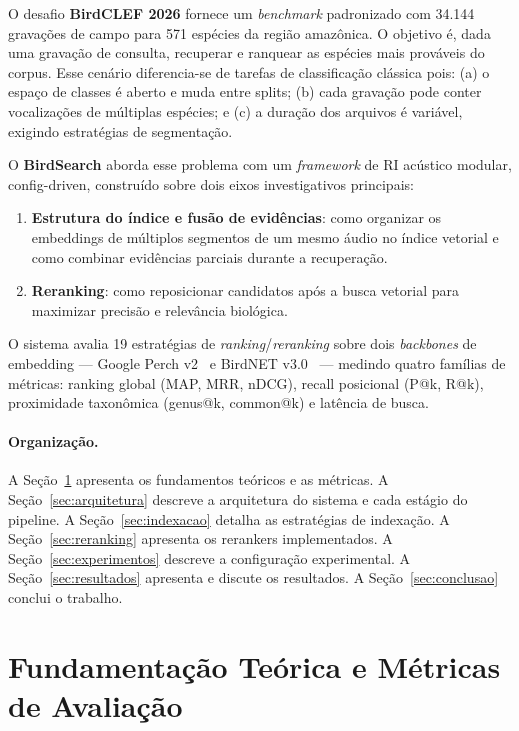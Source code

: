 \documentclass[12pt,a4paper]{article}
\begin{document}
O desafio \textbf{BirdCLEF 2026} fornece um \emph{benchmark} padronizado com
34.144 gravações de campo para 571 espécies da região amazônica. O objetivo é,
dada uma gravação de consulta, recuperar e ranquear as espécies mais prováveis
do corpus. Esse cenário diferencia-se de tarefas de classificação clássica pois:
(a) o espaço de classes é aberto e muda entre splits; (b) cada gravação pode
conter vocalizações de múltiplas espécies; e (c) a duração dos arquivos é
variável, exigindo estratégias de segmentação.

O \textbf{BirdSearch} aborda esse problema com um \emph{framework} de RI acústico
modular, config-driven, construído sobre dois eixos investigativos principais:

\begin{enumerate}
  \item \textbf{Estrutura do índice e fusão de evidências}: como organizar os
  embeddings de múltiplos segmentos de um mesmo áudio no índice vetorial e como
  combinar evidências parciais durante a recuperação.
  \item \textbf{Reranking}: como reposicionar candidatos após a busca vetorial
  para maximizar precisão e relevância biológica.
\end{enumerate}

O sistema avalia 19 estratégias de \emph{ranking}/\emph{reranking} sobre dois
\emph{backbones} de embedding --- Google Perch v2~\cite{merriënboer:25} e
BirdNET v3.0~\cite{kahl:21} --- medindo quatro famílias de métricas: ranking
global (MAP, MRR, nDCG), recall posicional (P@k, R@k), proximidade
taxonômica (genus@k, common@k) e latência de busca.

\paragraph{Organização.}
A Seção~\ref{sec:fundamentacao} apresenta os fundamentos teóricos e as métricas.
A Seção~\ref{sec:arquitetura} descreve a arquitetura do sistema e cada estágio
do pipeline. A Seção~\ref{sec:indexacao} detalha as estratégias de indexação.
A Seção~\ref{sec:reranking} apresenta os rerankers implementados. A
Seção~\ref{sec:experimentos} descreve a configuração experimental. A
Seção~\ref{sec:resultados} apresenta e discute os resultados. A
Seção~\ref{sec:conclusao} conclui o trabalho.

\section{Fundamentação Teórica e Métricas de Avaliação}
\label{sec:fundamentacao}
\end{document}
